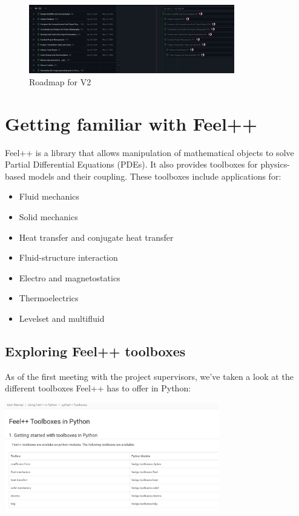\documentclass[12pt]{article}
\begin{document}
\begin{enumerate}
\begin{figure}[H]
    \centering
    \includegraphics[width=0.8\textwidth]{images/roadmapV2.png}
    \caption{Roadmap for V2}
\end{figure}




\newpage


\section{Getting familiar with Feel++}

Feel++ is a library that allows manipulation of mathematical objects to solve Partial Differential Equations (PDEs). It also provides toolboxes for physics-based models and their coupling. These toolboxes include applications for:

\begin{itemize}
    \item Fluid mechanics
    \item Solid mechanics
    \item Heat transfer and conjugate heat transfer
    \item Fluid-structure interaction
    \item Electro and magnetostatics
    \item Thermoelectrics
    \item Levelset and multifluid
\end{itemize}


\subsection{Exploring Feel++ toolboxes}

As of the first meeting with the project supervisors, we've taken a look at the different toolboxes Feel++ has to offer in Python:
\begin{frame}{}
    \begin{center}
        \includegraphics[width=0.7\textwidth]{images/pyfeelpptoolboxes.png}
    \end{center}
\end{frame}


\end{enumerate}
\end{document}
